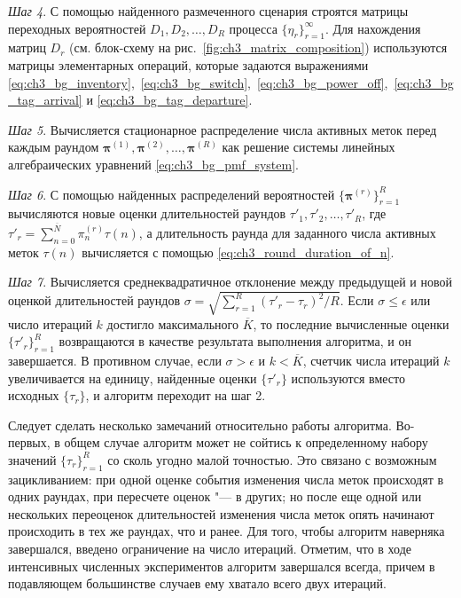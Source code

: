 \textit{Шаг 4}. С помощью найденного размеченного сценария строятся матрицы переходных вероятностей $D_1, D_2, \dots, D_R$ процесса $\{ \eta_r \}_{r=1}^\infty$. Для нахождения матриц $D_r$ (см. блок-схему на рис.~\ref{fig:ch3_matrix_composition}) используются матрицы элементарных операций, которые задаются выражениями \eqref{eq:ch3_bg_inventory},~\eqref{eq:ch3_bg_switch},~\eqref{eq:ch3_bg_power_off},~\eqref{eq:ch3_bg_tag_arrival} и \eqref{eq:ch3_bg_tag_departure}.

\textit{Шаг 5}. Вычисляется стационарное распределение числа активных меток перед каждым раундом $\bm{\pi}^{(1)}, \bm{\pi}^{(2)}, \dots, \bm{\pi}^{(R)}$ как решение системы линейных алгебраических уравнений \eqref{eq:ch3_bg_pmf_system}.

\textit{Шаг 6}. С помощью найденных распределений вероятностей $\{ \bm{\pi}^{(r)} \}_{r=1}^R$ вычисляются новые оценки длительностей раундов $\tau'_1, \tau'_2, \dots, \tau'_R$, где $\tau'_r = \sum_{n=0}^{\overline{N}} \pi^{(r)}_n \tau(n)$, а длительность раунда для заданного числа активных меток $\tau(n)$ вычисляется с помощью \eqref{eq:ch3_round_duration_of_n}.

\textit{Шаг 7}. Вычисляется среднеквадратичное отклонение между предыдущей и новой оценкой длительностей раундов $\sigma = \sqrt{\sum_{r=1}^R (\tau'_r - \tau_r)^2 / R}$. Если $\sigma \leqslant \epsilon$ или число итераций $k$ достигло максимального $\overline{K}$, то последние вычисленные оценки $\{ \tau'_r \}_{r=1}^R$ возвращаются в качестве результата выполнения алгоритма, и он завершается. В противном случае, если $\sigma > \epsilon$ и $k < \overline{K}$, счетчик числа итераций $k$ увеличивается на единицу, найденные оценки $\{ \tau'_r \}$ используются вместо исходных $\{ \tau_r \}$, и алгоритм переходит на шаг 2.

Следует сделать несколько замечаний относительно работы алгоритма. Во-первых, в общем случае алгоритм может не сойтись к определенному набору значений $\{ \tau_r \}_{r=1}^R$ со сколь угодно малой точностью. Это связано с возможным зацикливанием: при одной оценке события изменения числа меток происходят в одних раундах, при пересчете оценок "--- в других; но после еще одной или нескольких переоценок длительностей изменения числа меток опять начинают происходить в тех же раундах, что и ранее. Для того, чтобы алгоритм наверняка завершался, введено ограничение на число итераций. Отметим, что в ходе интенсивных численных экспериментов алгоритм завершался всегда, причем в подавляющем большинстве случаев ему хватало всего двух итераций.

